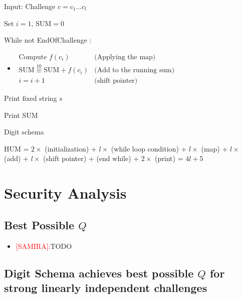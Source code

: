 \documentclass[anon,12pt]{colt2016}
\newenvironment{alg}{
    \begin{list}{}{
        \setlength{\itemsep}{2pt}
        \setlength{\parsep}{0pt}
        \setlength{\parskip}{0pt}
        \setlength{\topsep}{1pt}
    }
}
{
    \end{list}
}
\begin{document}
\begin{algorithm}
\begin{alg}
\item[] Input: Challenge $c=c_1 \ldots c_l$
\item[] Set $i=1$, SUM$=0$
\item[] While not EndOfChallenge :

\begin{itemize}
	\item[] $\begin{array}{lr}
		\text{Compute } f(c_i) & \text{(Applying the map)} \\
		\text{SUM} \overset{10}{\equiv} \text{SUM} + f(c_i) & \text{(Add to the running sum)} \\
			i=i+1 & \text{(shift pointer)} 
	\end{array}$
\end{itemize}

\item[] Print fixed string $s$
\item[] Print SUM

\label{alg:HUM}
\end{alg}
\caption{Digit schema}
\end{algorithm}

HUM =  $2 \times$ (initialization) + $l \times$ (while loop condition) + $l \times$ (map) + $l \times$ (add) + $l \times$ (shift pointer) + (end while) + $2 \times$ (print) = $4l+5$


\section{Security Analysis}

\subsection{Best Possible $Q$}

\begin{itemize}
	\item \textcolor{red}{[SAMIRA]:}TODO
\end{itemize}

\subsection{Digit Schema achieves best possible $Q$ for strong linearly independent challenges}
\end{document}

